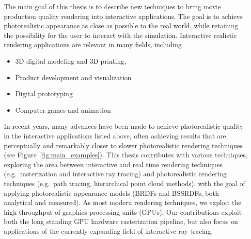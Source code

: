 The main goal of this thesis is to describe new techniques to bring movie production quality rendering into interactive applications.  The goal is to achieve photorealistic appearance as close as possible to the real world, while retaining the possibility for the user to interact with the simulation. 
Interactive realistic rendering applications are relevant in many fields, including
\begin{itemize}
\item 3D digital modeling and 3D printing,
\item Product development and visualization
\item Digital prototyping
\item Computer games and animation
\end{itemize}
In recent years, many advances have been made to achieve photorealistic quality in the interactive applications listed above, often achieving results that are perceptually and remarkably closer to slower photorealistic rendering techniques (see Figure~\ref{fig:main_examples}). This thesis contributes with various techniques, exploring the area between interactive and real time rendering techniques (e.g.\ rasterization and interactive ray tracing) and photorealistic rendering techniques (e.g.\ path tracing, hierarchical point cloud methods), with the goal of applying photorealistic appearance models (BRDFs and BSSRDFs, both analytical and measured). As most modern rendering techniques, we exploit the high throughput of graphics processing units (GPUs). Our contributions exploit both the long standing GPU hardware rasterization pipeline, but also focus on applications of the currently expanding field of interactive ray tracing. 

